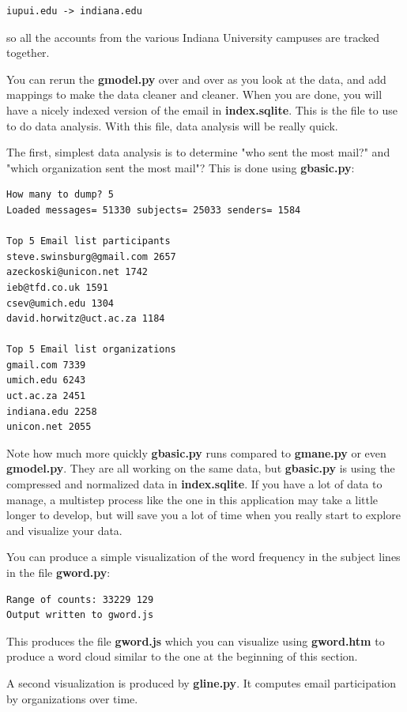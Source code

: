 \beforeverb
\begin{verbatim}
iupui.edu -> indiana.edu
\end{verbatim}
\afterverb
%
so all the accounts from the various Indiana University campuses are tracked together.

You can rerun the {\bf gmodel.py} over and over as you look at the data, and add mappings
to make the data cleaner and cleaner.   When you are done, you will have a nicely
indexed version of the email in {\bf index.sqlite}.   This is the file to use to do data
analysis.   With this file, data analysis will be really quick.

The first, simplest data analysis is to determine "who sent the most mail?" and "which 
organization sent the most mail"?  This is done using {\bf gbasic.py}:

\beforeverb
\begin{verbatim}
How many to dump? 5
Loaded messages= 51330 subjects= 25033 senders= 1584

Top 5 Email list participants
steve.swinsburg@gmail.com 2657
azeckoski@unicon.net 1742
ieb@tfd.co.uk 1591
csev@umich.edu 1304
david.horwitz@uct.ac.za 1184

Top 5 Email list organizations
gmail.com 7339
umich.edu 6243
uct.ac.za 2451
indiana.edu 2258
unicon.net 2055
\end{verbatim}
\afterverb
%
Note how much more quickly {\bf gbasic.py} runs compared to {\bf gmane.py}
or even {\bf gmodel.py}. They are all working on the same data, but 
{\bf gbasic.py} is using the compressed and normalized data in 
{\bf index.sqlite}.  If you have a lot of data to manage, a multistep
process like the one in this application may take a little longer to develop,
but will save you a lot of time when you really start to explore
and visualize your data.

You can produce a simple visualization of the word frequency in the subject lines
in the file {\bf gword.py}:

\beforeverb
\begin{verbatim}
Range of counts: 33229 129
Output written to gword.js
\end{verbatim}
\afterverb
%

This produces the file {\bf gword.js} which you can visualize using
{\bf gword.htm} to produce a word cloud similar to the one at the beginning 
of this section.

A second visualization is produced  by {\bf gline.py}.  It computes email 
participation by organizations over time.

